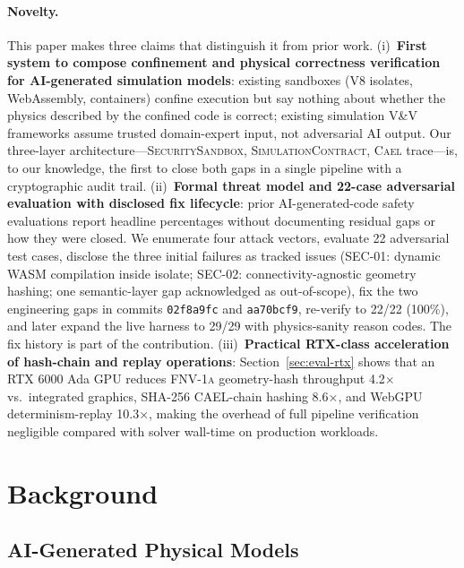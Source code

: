 \documentclass[letterpaper,twocolumn,10pt]{article}
\newcommand{\cael}{\textsc{Cael}}
\newcommand{\simcontract}{\textsc{SimulationContract}}
\newcommand{\fnvhash}{\textsc{FNV-1a}}
\newcommand{\sandbox}{\textsc{SecuritySandbox}} %
\begin{document}
\paragraph{Novelty.}
This paper makes three claims that distinguish it from prior work.
(i)~\textbf{First system to compose confinement and physical correctness
verification for AI-generated simulation models}: existing sandboxes
(V8 isolates, WebAssembly, containers) confine execution but say
nothing about whether the physics described by the confined code is
correct; existing simulation V\&V frameworks assume trusted domain-expert
input, not adversarial AI output.  Our three-layer architecture---\sandbox{},
\simcontract{}, \cael{} trace---is, to our knowledge, the first to close
both gaps in a single pipeline with a cryptographic audit trail.
(ii)~\textbf{Formal threat model and 22-case adversarial evaluation
with disclosed fix lifecycle}: prior AI-generated-code safety evaluations
report headline percentages without documenting residual gaps or how they
were closed.  We enumerate four attack vectors, evaluate 22 adversarial
test cases, disclose the three initial failures as tracked issues
(SEC-01: dynamic WASM compilation inside isolate; SEC-02: connectivity-agnostic
geometry hashing; one semantic-layer gap acknowledged as out-of-scope),
fix the two engineering gaps in commits \texttt{02f8a9fc} and
\texttt{aa70bcf9}, re-verify to 22/22 (100\%), and later expand the live
harness to 29/29 with physics-sanity reason codes. The fix history is
part of the contribution.
(iii)~\textbf{Practical RTX-class acceleration of hash-chain and replay
operations}: Section~\ref{sec:eval-rtx} shows that an RTX 6000 Ada GPU
reduces \fnvhash{} geometry-hash throughput 4.2$\times$ vs.\ integrated
graphics, SHA-256 CAEL-chain hashing 8.6$\times$, and WebGPU
determinism-replay 10.3$\times$, making the overhead of full
pipeline verification negligible compared with solver wall-time on
production workloads.


\section{Background}
\label{sec:background}

\subsection{AI-Generated Physical Models}
\end{document}
